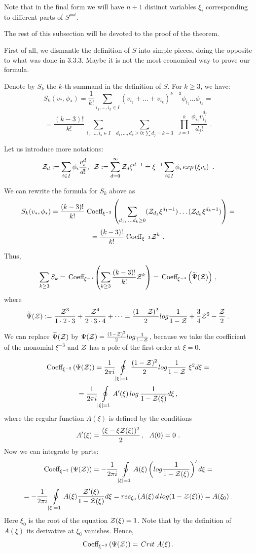 \documentclass{amsart}
\begin{document}
Note that in the final form we will have $n+1$ distinct variables
 $\xi _i$ corresponding to different parts of $S^{pot}$.


The rest of this subsection will be devoted to the proof of the theorem.

First of all,  we dismantle the definition of $S$ into simple pieces, doing the
opposite to what was done in 3.3.3.
 Maybe it is not the most economical way to prove our formula.

Denote by $S_k$ the $k$-th summand in the definition of $S$.
For $k\ge 3$, we have:
$$S_k(v_*,\phi_*)=\frac{1}{k!}\sum_{i_1,\dots,i_k \in I}
 (v_{i_1}+\dots+v_{i_k})^{k-3}
\phi_{i_1}\dots \phi_{i_k}=$$
$$=\frac{(k-3)!}{k!}\,\sum_{i_1,\dots,i_k \in I}\,\,\,\sum_{d_1,\dots,d_k\ge
0:\sum d_j=k-3} \,\,\,\prod_{j=1}^k \frac{\phi_{i_j}v_{i_j}^{d_j}}{d_j!}\,\,.$$

Let us introduce more notations:
$$\mathcal Z_d:=\sum_{i\in I} \phi_i \frac {v_i^d}{d!},\,\,\,\mathcal
Z:=\sum_{d=0}^{\infty} \mathcal Z_d \xi ^{d-1}=\xi ^{-1}\sum_{i\in I}\phi_i
\,exp\,(\xi v_i)\,\,\,.$$

We can rewrite the formula for $S_k$ above as
$$S_k(v_*,\phi_*)=
\frac{(k-3)!}{k!}\,\,\hbox{Coeff}_{\xi ^{-3}}\left(\sum_{d_1,\dots,d_k\ge 0}
(\mathcal Z_{d_1} \xi ^{d_1-1})\dots(\mathcal Z_{d_k} \xi ^{d_k-1})\right)=$$
$$=\frac{(k-3)!}{k!}\,\,\hbox{Coeff}_{\xi ^{-3}}\mathcal Z^k \,\,.$$

Thus,
$$\sum_{k\ge 3} S_k=\,\hbox{Coeff}_{\xi ^{-3}}
\left(
\sum_{k\ge 3}\frac{(k-3)!}{k!}\mathcal
Z^k\right)=\,\hbox{Coeff}_{\xi ^{-3}}\left(\widetilde
{\Psi}(\mathcal Z)\right)\,,$$
where
$$\widetilde
{\Psi}(\mathcal Z):=\frac{{\mathcal Z}^3}{1\cdot2\cdot3}+\frac{{\mathcal
Z}^4}{2\cdot3\cdot4}+\dots=\frac{(1-\mathcal Z)^2}{2}log\frac{1}{1-\mathcal
Z}+\frac{3}{4}\mathcal Z^2-\frac {\mathcal Z}{2}\,\,.$$

We can replace  $\widetilde
{\Psi}(\mathcal Z)$ by ${\Psi}(\mathcal Z)=\frac{(1-\mathcal Z)^2}{2}log\frac{1}{1-\mathcal
Z}$, because we take the coefficient of the monomial $\xi ^{-3}$ and $\mathcal Z$
has a pole of the first order at $\xi =0$.

$$\hbox{Coeff}_{\xi ^{-3}}\left(
{\Psi}(\mathcal Z)\right)=\frac{1}{2\pi i}\oint\limits_{|\xi |=1}\frac{(1-\mathcal
Z)^2}{2}log\frac{1}{1-\mathcal Z} \,\,\xi ^2 d\xi =$$
$$= \frac{1}{2\pi i}\oint\limits_{|\xi |=1} A'(\xi )\,log\,\frac{1}{1-\mathcal
Z(\xi )}d\xi \,,$$
where the regular function $A(\xi )$ is defined by the conditions
$$A'(\xi )=\frac{(\xi -\xi \mathcal Z(\xi ))^2}{2}\,,\,\,\,\,A(0)=0\,\,.$$
Now we can integrate by parts:
$$\hbox{Coeff}_{\xi ^{-3}}\left(
{\Psi}(\mathcal Z)\right)=-\frac{1}{2\pi i}\oint\limits_{|\xi |=1}
 A(\xi )\left(log\frac{1}{1-\mathcal Z(\xi )}\right)'d\xi =$$
$$=-\frac{1}{2\pi i}\oint\limits_{|\xi |=1}
 A(\xi )\frac{\mathcal Z'(\xi )}{1-\mathcal Z(\xi )}d\xi =res_{\xi
_0}\left(A(\xi)\,d\,log(1-\mathcal Z(\xi))\right)=A(\xi _0)\,.$$
 Here $\xi _0$ is the root of the equation $\mathcal Z(\xi )=1$. Note that
 by the definition of $A(\xi )$ its derivative at $\xi _0$ vanishes.
 Hence,
$$\hbox{Coeff}_{\xi ^{-3}}\left(
{\Psi}(\mathcal Z)\right)=\,Crit\,\,A(\xi )\,.$$
\end{document}
